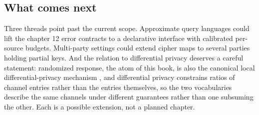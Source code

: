 \subsection*{What comes next}

Three threads point past the current scope. Approximate query languages
could lift the chapter 12 error contracts to a declarative interface with
calibrated per-source budgets. Multi-party settings could extend cipher
maps to several parties holding partial keys. And the relation to
differential privacy deserves a careful statement: randomized response,
the atom of this book, is also the canonical local differential-privacy
mechanism \parencite{warner-1965,erlingsson-pihur-korolova-2014}, and
differential privacy constrains ratios of channel entries rather than the
entries themselves, so the two vocabularies describe the same channels
under different guarantees rather than one subsuming the other. Each is a
possible extension, not a planned chapter.
